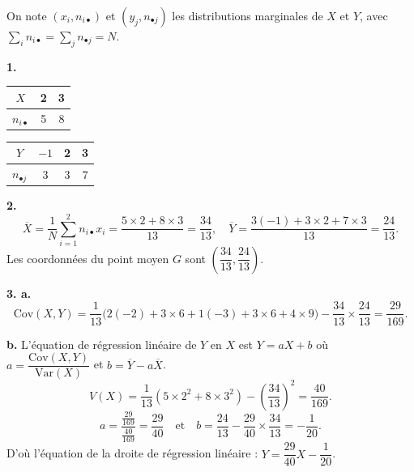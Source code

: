 \documentclass[11pt]{article}
\begin{document}

On note $(x_i, n_{i\bullet})$ et $(y_j, n_{\bullet j})$ les distributions marginales de $X$ et $Y$, avec $\sum_i n_{i\bullet} = \sum_j n_{\bullet j} = N$.

\textbf{1.}
\begin{center}\renewcommand{\arraystretch}{1.3}
\begin{tabular}{|c|c|c|}\hline $X$ & 2 & 3 \\\hline $n_{i\bullet}$ & 5 & 8 \\\hline\end{tabular}
\qquad
\begin{tabular}{|c|c|c|c|}\hline $Y$ & $-1$ & 2 & 3 \\\hline $n_{\bullet j}$ & 3 & 3 & 7 \\\hline\end{tabular}
\end{center}

\textbf{2.}
\[ \overline{X} = \frac{1}{N}\sum_{i=1}^2 n_{i\bullet}x_i = \frac{5 \times 2 + 8 \times 3}{13} = \frac{34}{13}, \quad \overline{Y} = \frac{3(-1) + 3 \times 2 + 7 \times 3}{13} = \frac{24}{13}. \]
Les coordonnées du point moyen $G$ sont $\left(\dfrac{34}{13}, \dfrac{24}{13}\right)$.

\textbf{3. a.}
\[ \mathrm{Cov}(X, Y) = \frac{1}{13}\big(2(-2) + 3 \times 6 + 1(-3) + 3 \times 6 + 4 \times 9\big) - \frac{34}{13} \times \frac{24}{13} = \frac{29}{169}. \]

\textbf{b.} L'équation de régression linéaire de $Y$ en $X$ est $Y = aX + b$ où $a = \dfrac{\mathrm{Cov}(X, Y)}{\mathrm{Var}(X)}$ et $b = \overline{Y} - a\overline{X}$.
\[ V(X) = \frac{1}{13}(5 \times 2^2 + 8 \times 3^2) - \left(\frac{34}{13}\right)^2 = \frac{40}{169}. \]
\[ a = \frac{\frac{29}{169}}{\frac{40}{169}} = \frac{29}{40} \quad \text{et} \quad b = \frac{24}{13} - \frac{29}{40} \times \frac{34}{13} = -\frac{1}{20}. \]
D'où l'équation de la droite de régression linéaire : $Y = \dfrac{29}{40}X - \dfrac{1}{20}$.
\end{document}
